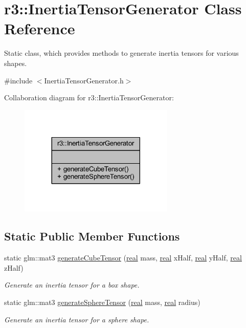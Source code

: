 \hypertarget{classr3_1_1_inertia_tensor_generator}{}\section{r3\+:\+:Inertia\+Tensor\+Generator Class Reference}
\label{classr3_1_1_inertia_tensor_generator}


Static class, which provides methods to generate inertia tensors for various shapes.  




{\ttfamily \#include $<$Inertia\+Tensor\+Generator.\+h$>$}



Collaboration diagram for r3\+:\+:Inertia\+Tensor\+Generator\+:\nopagebreak
\begin{figure}[H]
\begin{center}
\leavevmode
\includegraphics[width=209pt]{classr3_1_1_inertia_tensor_generator__coll__graph}
\end{center}
\end{figure}
\subsection*{Static Public Member Functions}
\begin{DoxyCompactItemize}
\item 
static glm\+::mat3 \mbox{\hyperlink{classr3_1_1_inertia_tensor_generator_ae4d92045858bfe898a3bc6c779fe3d9b}{generate\+Cube\+Tensor}} (\mbox{\hyperlink{namespacer3_ab2016b3e3f743fb735afce242f0dc1eb}{real}} mass, \mbox{\hyperlink{namespacer3_ab2016b3e3f743fb735afce242f0dc1eb}{real}} x\+Half, \mbox{\hyperlink{namespacer3_ab2016b3e3f743fb735afce242f0dc1eb}{real}} y\+Half, \mbox{\hyperlink{namespacer3_ab2016b3e3f743fb735afce242f0dc1eb}{real}} z\+Half)
\begin{DoxyCompactList}\small\item\em Generate an inertia tensor for a box shape. \end{DoxyCompactList}\item 
static glm\+::mat3 \mbox{\hyperlink{classr3_1_1_inertia_tensor_generator_a637b526735235ca96cab6e7414f7a8c2}{generate\+Sphere\+Tensor}} (\mbox{\hyperlink{namespacer3_ab2016b3e3f743fb735afce242f0dc1eb}{real}} mass, \mbox{\hyperlink{namespacer3_ab2016b3e3f743fb735afce242f0dc1eb}{real}} radius)
\begin{DoxyCompactList}\small\item\em Generate an inertia tensor for a sphere shape. \end{DoxyCompactList}\end{DoxyCompactItemize}


